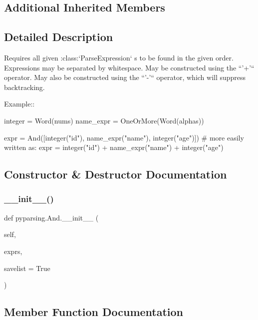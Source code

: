 \subsection*{Additional Inherited Members}


\subsection{Detailed Description}
\begin{DoxyVerb}Requires all given :class:`ParseExpression` s to be found in the given order.
Expressions may be separated by whitespace.
May be constructed using the ``'+'`` operator.
May also be constructed using the ``'-'`` operator, which will
suppress backtracking.

Example::

    integer = Word(nums)
    name_expr = OneOrMore(Word(alphas))

    expr = And([integer("id"), name_expr("name"), integer("age")])
    # more easily written as:
    expr = integer("id") + name_expr("name") + integer("age")
\end{DoxyVerb}
 

\subsection{Constructor \& Destructor Documentation}
\mbox{\label{classpyparsing_1_1And_a7d545999e60093ae923593d5d107b3c8}} 
\subsubsection{\texorpdfstring{\+\_\+\+\_\+init\+\_\+\+\_\+()}{\_\_init\_\_()}}
{\footnotesize\ttfamily def pyparsing.\+And.\+\_\+\+\_\+init\+\_\+\+\_\+ (\begin{DoxyParamCaption}\item[{}]{self,  }\item[{}]{exprs,  }\item[{}]{savelist = {\ttfamily True} }\end{DoxyParamCaption})}



\subsection{Member Function Documentation}
\mbox{\label{classpyparsing_1_1And_a1f2a748fb795638a7f2af39ee056d625}} 
